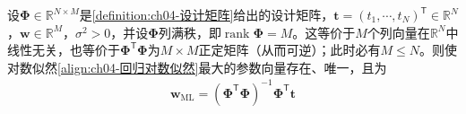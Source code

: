 \documentclass[../../main.tex]{subfiles}
\begin{document}
\begin{proposition}[最大似然解]\label{proposition:ch04-最大似然解}
设$\boldsymbol{\Phi}\in\mathbb{R}^{N\times M}$是\cref{definition:ch04-设计矩阵}给出的设计矩阵，$\boldsymbol{t}=(t_1,\cdots,t_N)^{\mathsf{T}}\in\mathbb{R}^{N}$，$\boldsymbol{w}\in\mathbb{R}^{M}$，$\sigma^{2}>0$，并设$\boldsymbol{\Phi}$列满秩，即$\operatorname{rank}\boldsymbol{\Phi}=M$。这等价于$M$个列向量在$\mathbb{R}^{N}$中线性无关，也等价于$\boldsymbol{\Phi}^{\mathsf{T}}\boldsymbol{\Phi}$为$M\times M$正定矩阵（从而可逆）；此时必有$M\leqslant N$。则使对数似然\eqref{align:ch04-回归对数似然}最大的参数向量存在、唯一，且为
\begin{align}
  \boldsymbol{w}_{\mathrm{ML}}=(\boldsymbol{\Phi}^{\mathsf{T}}\boldsymbol{\Phi})^{-1}\boldsymbol{\Phi}^{\mathsf{T}}\boldsymbol{t}
  \label{align:ch04-最小二乘解}
\end{align}
\end{proposition}
\end{document}
